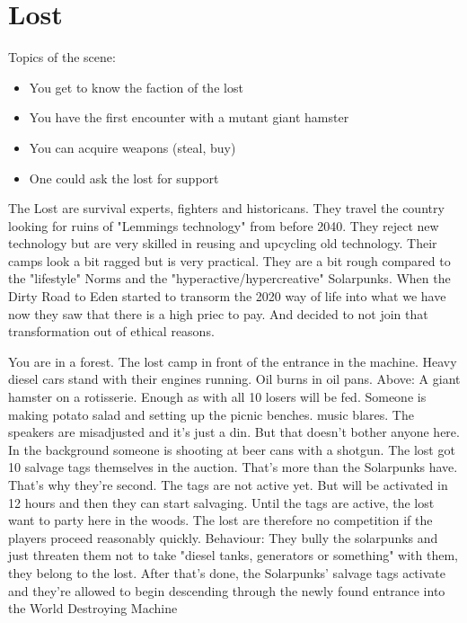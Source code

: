 \section{Lost}

Topics of the scene:

\begin{itemize}
\item You get to know the faction of the lost
\item You have the first encounter with a mutant giant hamster
\item You can acquire weapons (steal, buy)
\item One could ask the lost for support
\end{itemize}

\begin{sidebarBox}[title=The Lost]
The Lost are survival experts, fighters and historicans. They travel the country looking for ruins of "Lemmings technology" from before 2040. They reject new technology but are very skilled in reusing and upcycling old technology. Their camps look a bit ragged but is very practical. They are a bit rough compared to the "lifestyle" Norms and the "hyperactive/hypercreative" Solarpunks. When the Dirty Road to Eden started to transorm the 2020 way of life into what we have now they saw that there is a high priec to pay. And decided to not join that transformation out of ethical reasons.
\end{sidebarBox}

You are in a forest. The lost camp in front of the entrance in the machine. Heavy diesel cars stand with their engines
running. Oil burns in oil pans. Above: A giant hamster on a rotisserie. Enough as with all 10 losers will be fed.
Someone is making potato salad and setting up the picnic benches. music blares.
The speakers are misadjusted and it's just a din. But that doesn't bother anyone here. In the background someone
is shooting at beer cans with a shotgun. The lost got 10 salvage tags themselves in the auction. That's more than the
Solarpunks have. That's why they're second. The tags are not active yet.
But will be activated in 12 hours and then they can start salvaging. Until the tags are active, the lost want to party
here in the woods. The lost are therefore no competition if the players proceed reasonably quickly.
Behaviour: They bully the solarpunks and just threaten them not to take "diesel tanks, generators or something" with
them, they belong to the lost.
After that's done, the Solarpunks' salvage tags activate and they're allowed to begin descending through the newly
found entrance into the World Destroying Machine

